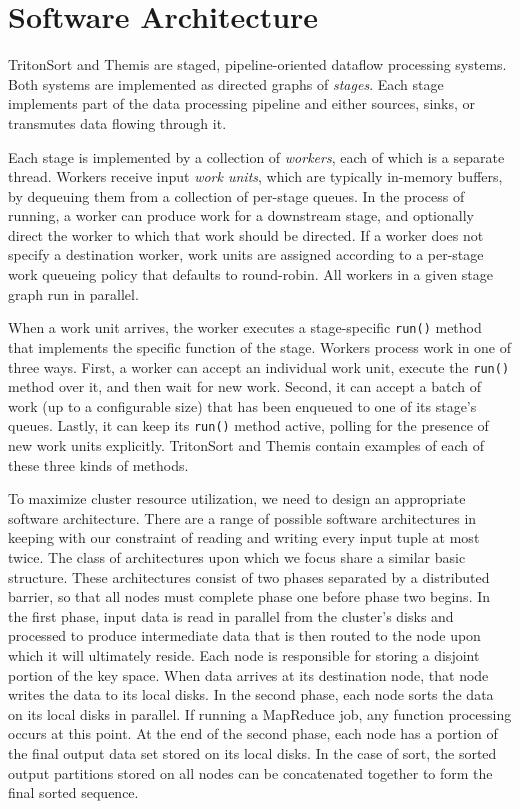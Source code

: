 \section{Software Architecture}

TritonSort and Themis are staged, pipeline-oriented dataflow processing
systems. Both systems are implemented as directed graphs of \emph{stages}. Each
stage implements part of the data processing pipeline and either sources,
sinks, or transmutes data flowing through it.

Each stage is implemented by a collection of \emph{workers}, each of which is a
separate thread. Workers receive input \emph{work units}, which are typically
in-memory buffers, by dequeuing them from a collection of per-stage queues. In
the process of running, a worker can produce work for a downstream stage, and
optionally direct the worker to which that work should be directed. If a worker
does not specify a destination worker, work units are assigned according to a
per-stage work queueing policy that defaults to round-robin. All workers in a
given stage graph run in parallel.

When a work unit arrives, the worker executes a stage-specific \texttt{run()}
method that implements the specific function of the stage. Workers process work
in one of three ways. First, a worker can accept an individual work unit,
execute the \texttt{run()} method over it, and then wait for new work. Second,
it can accept a batch of work (up to a configurable size) that has been
enqueued to one of its stage's queues. Lastly, it can keep its \texttt{run()}
method active, polling for the presence of new work units
explicitly. TritonSort and Themis contain examples of each of these three kinds
of methods.

To maximize cluster resource utilization, we need to design an appropriate
software architecture.  There are a range of possible software architectures in
keeping with our constraint of reading and writing every input tuple at most
twice.  The class of architectures upon which we focus share a similar basic
structure. These architectures consist of two phases separated by a distributed
barrier, so that all nodes must complete phase one before phase two begins.  In
the first phase, input data is read in parallel from the cluster's disks and
processed to produce intermediate data that is then routed to the node upon
which it will ultimately reside.  Each node is responsible for storing a
disjoint portion of the key space.  When data arrives at its destination node,
that node writes the data to its local disks.  In the second phase, each node
sorts the data on its local disks in parallel.  If running a MapReduce job, any
\reduce function processing occurs at this point. At the end of the second
phase, each node has a portion of the final output data set stored on its local
disks. In the case of sort, the sorted output partitions stored on all nodes
can be concatenated together to form the final sorted sequence.
